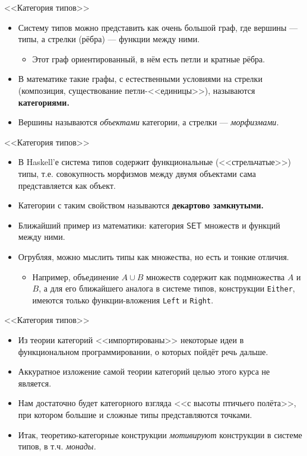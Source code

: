 \documentclass[xcolor=dvipsnames]{beamer}
\begin{document}
\begin{frame}{<<Категория типов>>}
 
 \begin{itemize}[<+->]
  \item Систему типов можно представить как очень большой граф,
  где вершины --- типы, а стрелки (рёбра) --- функции между ними.
  \begin{itemize}
  \item Этот граф ориентированный, в нём есть петли и кратные рёбра.
  \end{itemize}
  \item В математике такие графы, с естественными условиями на стрелки (композиция, существование петли-<<единицы>>), называются {\bf категориями.}
    \item Вершины называются {\em объектами} категории, а стрелки --- {\em морфизмами.}
 \end{itemize}

\end{frame}

\begin{frame}{<<Категория типов>>}

\begin{itemize}[<+->]
 \item  В Haskell'е система типов содержит функциональные (<<стрельчатые>>) типы, т.е. совокупность морфизмов между двумя объектами сама представляется как объект.
 \item Категории с таким свойством называются {\bf декартово замкнутыми.}
 \item Ближайший пример из математики: категория $\mathsf{SET}$ множеств и функций между ними.
 \item Огрубляя, можно мыслить типы как множества, но есть и тонкие отличия.
 \begin{itemize}
 \item Например, объединение $A \cup B$ множеств содержит как подмножества $A$ и $B$, а для его ближайшего аналога в системе типов, конструкции \texttt{Either}, имеются только функции-вложения \texttt{Left} и \texttt{Right}.
 \end{itemize}
\end{itemize}

\end{frame}

\begin{frame}{<<Категория типов>>}
 
 \begin{itemize}[<+->]
  \item Из теории категорий <<импортированы>> некоторые идеи в функциональном программировании, о которых пойдёт речь дальше.
  \item Аккуратное изложение самой теории категорий целью этого курса не является.
  \item Нам достаточно будет категорного взгляда <<с высоты птичьего полёта>>, при котором большие и сложные типы представляются точками.
  \item Итак, теоретико-категорные конструкции
{\em мотивируют} конструкции в системе типов, в т.ч. {\em монады.}
 \end{itemize}

\end{frame}
\end{document}

